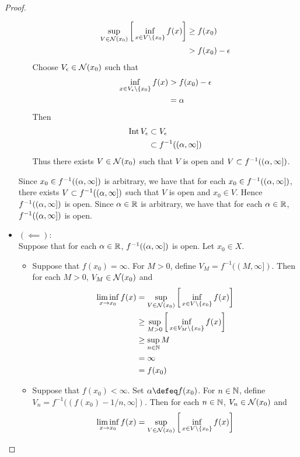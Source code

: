 \documentclass{book}
\begin{document}
\begin{proof}
\begin{itemize}
\begin{itemize}
			\begin{align*}
				\sup_{V \in \mathcal{N}(x_0)} \bigg[ \inf_{x \in V \setminus \{x_0\}} f(x)  \bigg]
				& \geq f(x_0) \\
				& > f(x_0) - \epsilon 
			\end{align*}
			Choose $V_{\epsilon} \in \mathcal{N}(x_0)$ such that 
			\begin{align*}
				\inf_{x \in V_{\epsilon} \setminus \{x_0\}} f(x)  
				&> f(x_0) - \epsilon \\
				&= \alpha
			\end{align*}
			Then
			\begin{align*}
				\operatorname{Int} V_{\epsilon} 
				& \subset V_{\epsilon} \\
				&\subset f^{-1}((\alpha, \infty])
			\end{align*} 
			Thus there exists $V \in \mathcal{N}(x_0)$ such that $V$ is open and $V \subset f^{-1}((\alpha, \infty])$.
		\end{itemize}
		Since $x_0 \in f^{-1}((\alpha, \infty])$ is arbitrary, we have that for each $x_0 \in f^{-1}((\alpha, \infty])$, there exists $V \subset f^{-1}((\alpha, \infty])$ such that $V$ is open and $x_0 \in V$. Hence $f^{-1}((\alpha, \infty])$ is open. Since $\alpha \in \mathbb{R}$ is arbitrary, we have that for each $\alpha \in \mathbb{R}$, $f^{-1}((\alpha, \infty])$ is open.
		\item $(\impliedby):$ \\ 
		Suppose that for each $\alpha \in \mathbb{R}$, $f^{-1}((\alpha, \infty])$ is open. Let $x_0 \in X$. 
		\begin{itemize}
			\item Suppose that $f(x_0) = \infty$.  For $M > 0$, define $V_M = f^{-1}((M, \infty]) $. Then for each $M > 0$, $V_M \in \mathcal{N}(x_0)$ and 
			\begin{align*}
				\liminf_{x \rightarrow x_0} f(x) 
				&= \sup_{V \in \mathcal{N}(x_0)} \bigg[ \inf_{x \in V \setminus \{x_0\}} f(x) \bigg] \\
				& \geq \sup_{M > 0} \bigg[ \inf_{x \in V_M \setminus \{x_0\}} f(x) \bigg] \\
				& \geq \sup_{n \in \mathbb{N}} M \\
				& = \infty \\
				&= f(x_0) 
			\end{align*}
			\item Suppose that $f(x_0) < \infty$. Set $\al \defeq f(x_0)$. For $n \in \mathbb{N}$, define $V_n = f^{-1}((f(x_0)-1/n, \infty]) $. Then for each $n \in \mathbb{N}$, $V_n \in \mathcal{N}(x_0)$ and 
			\begin{align*}
				\liminf_{x \rightarrow x_0} f(x) 
				&= \sup_{V \in \MN(x_0)} \bigg[ \inf_{x \in V \setminus \{x_0\}} f(x) \bigg] \\

\end{align*}
\end{itemize}
\end{itemize}
\end{proof}
\end{document}
